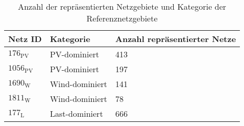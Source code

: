 {
\renewcommand{\arraystretch}{1.2}%
\begin{table}[H]
	\begin{center}
		\caption{Anzahl der repräsentierten Netzgebiete und Kategorie der Referenznetzgebiete}
		\begin{tabu} to 0.7\textwidth {X[0.6] X[1] X[1.5, r] }
			\toprule
			Netz ID    & Kategorie      & Anzahl repräsentierter Netze \\ \midrule
			\(176_{\text{PV}}\)  & PV-dominiert   & \num{413}                    \\
			\(1056_{\text{PV}}\) & PV-dominiert   & \num{197}                    \\
			\(1690_{\text{W}}\) & Wind-dominiert & \num{141}                    \\
			\(1811_{\text{W}}\) & Wind-dominiert & \num{78}                     \\
			\(177_{\text{L}}\)  & Last-dominiert & \num{666}                    \\ \bottomrule
		\end{tabu}
		\label{tab:grid_IDs}
	\end{center}
	\vspace{-3mm}%
\end{table}
}
